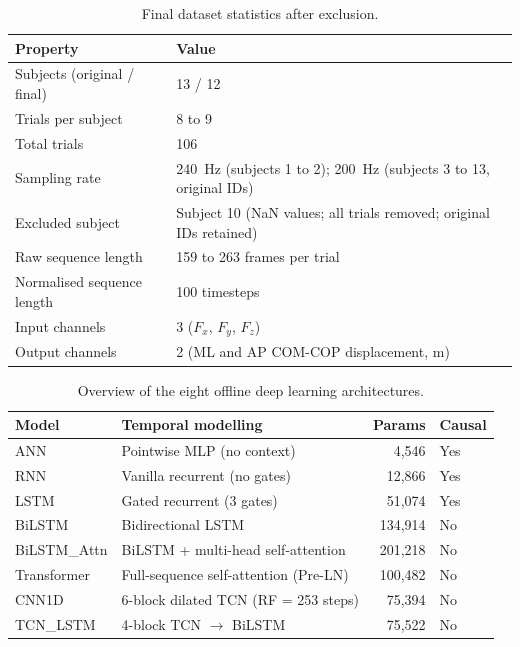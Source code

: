 \documentclass[preprint,12pt]{elsarticle}
\begin{document}
\begin{table}[H]
\centering
\caption{Final dataset statistics after exclusion.}
\label{tab:dataset}
\begin{tabular}{ll}
\toprule
Property & Value \\
\midrule
Subjects (original / final) & 13 / 12 \\
Trials per subject & 8 to 9 \\
Total trials & 106 \\
Sampling rate & 240~Hz (subjects 1 to 2); 200~Hz (subjects 3 to 13, original IDs) \\
Excluded subject & Subject 10 (NaN values; all trials removed; original IDs retained) \\
Raw sequence length & 159 to 263 frames per trial \\
Normalised sequence length & 100 timesteps \\
Input channels & 3 ($F_x$, $F_y$, $F_z$) \\
Output channels & 2 (ML and AP COM-COP displacement, m) \\
\bottomrule
\end{tabular}
\end{table}

\begin{table}[H]
\centering
\caption{Overview of the eight offline deep learning architectures.}
\label{tab:archs}
\begin{tabular}{llrl}
\toprule
Model & Temporal modelling & Params & Causal \\
\midrule
ANN          & Pointwise MLP (no context)              &   4,546 & Yes \\
RNN          & Vanilla recurrent (no gates)            &  12,866 & Yes \\
LSTM         & Gated recurrent (3 gates)               &  51,074 & Yes \\
BiLSTM       & Bidirectional LSTM                      & 134,914 & No  \\
BiLSTM\_Attn & BiLSTM + multi-head self-attention      & 201,218 & No  \\
Transformer  & Full-sequence self-attention (Pre-LN)   & 100,482 & No  \\
CNN1D        & 6-block dilated TCN (RF = 253 steps)    &  75,394 & No  \\
TCN\_LSTM    & 4-block TCN $\rightarrow$ BiLSTM        &  75,522 & No  \\
\bottomrule
\end{tabular}
\end{table}
\end{document}
